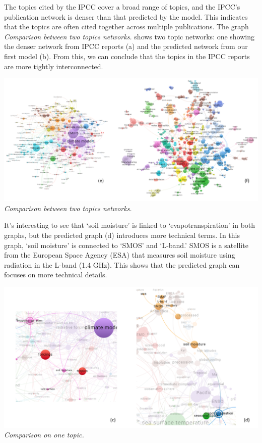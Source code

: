 \documentclass[
]{article}
\begin{document}
The topics cited by the IPCC cover a broad range of topics, and the
IPCC's publication network is denser than that predicted by the model.
This indicates that the topics are often cited together across multiple
publications. The graph \emph{Comparison between two topics networks.}
shows two topic networks: one showing the denser network from IPCC
reports (a) and the predicted network from our first model (b). From
this, we can conclude that the topics in the IPCC reports are more
tightly interconnected.

\includegraphics{./images/teds_network_topics2.png} \emph{Comparison
between two topics networks.}

It's interesting to see that `soil moisture' is linked to
`evapotranspiration' in both graphs, but the predicted graph (d)
introduces more technical terms. In this graph, `soil moisture' is
connected to `SMOS' and `L-band.' SMOS is a satellite from the European
Space Agency (ESA) that measures soil moisture using radiation in the
L-band (1.4 GHz). This shows that the predicted graph can focuses on
more technical details.

\includegraphics{./images/teds_network_topics2_sensors.png}
\emph{Comparison on one topic.}
\end{document}

